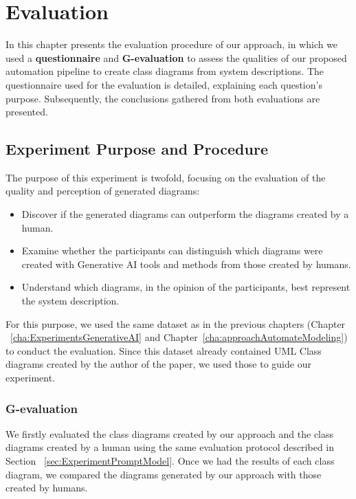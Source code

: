 
%

\chapter{Evaluation}
\label{cha:Evaluation}
In this chapter presents the evaluation procedure of our approach, in which we used a 
\textbf{questionnaire} and \textbf{G-evaluation} to assess the qualities of our proposed 
automation pipeline to create class diagrams from system descriptions. The questionnaire 
used for the evaluation is detailed, explaining each question's purpose. Subsequently, the 
conclusions gathered from both evaluations are presented.

\section{Experiment Purpose and Procedure}
\label{sec:experiment-purpose}
The purpose of this experiment is twofold, focusing on the evaluation of the quality and perception of generated diagrams:  

\begin{itemize}
    \item Discover if the generated diagrams can outperform the diagrams created by a human.  
    \item Examine whether the participants can distinguish which diagrams were created with Generative AI tools and methods from those created by humans.
    \item Understand which diagrams, in the opinion of the participants, best represent the system description.  
\end{itemize}

For this purpose, we used the same dataset as in the previous chapters (Chapter ~\ref{cha:ExperimentsGenerativeAI} and 
Chapter~\ref{cha:approachAutomateModeling}) to conduct the evaluation. Since this dataset \cite{DatasetDeBari2024} already 
contained UML Class diagrams created by the author of the paper, we used those to guide our experiment.

\subsection{G-evaluation}
\label{sec:G-evaluation}
We firstly evaluated the class diagrams created by our approach and the class diagrams created by a human using the same evaluation protocol described in 
Section ~\ref{sec:ExperimentPromptModel}. Once we had the results of each class diagram, we compared the diagrams generated by our approach with those created by humans.  

